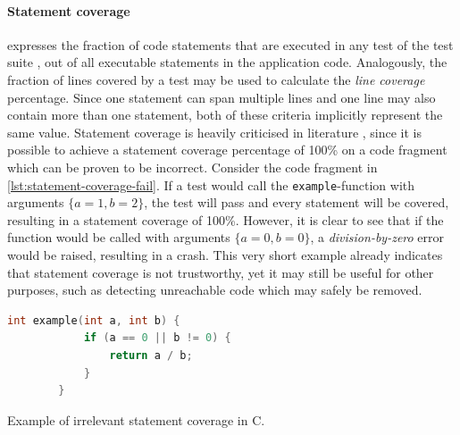 \paragraph*{Statement coverage} expresses the fraction of code statements that are executed in any test of the test suite \cite{6588537}, out of all executable statements in the application code. Analogously, the fraction of lines covered by a test may be used to calculate the \emph{line coverage} percentage. Since one statement can span multiple lines and one line may also contain more than one statement, both of these criteria implicitly represent the same value. Statement coverage is heavily criticised in literature \cite[p.~37]{Myers:2011:AST:2161638}, since it is possible to achieve a statement coverage percentage of 100\% on a code fragment which can be proven to be incorrect. Consider the code fragment in \autoref{lst:statement-coverage-fail}. If a test would call the \texttt{example}-function with arguments $\{a = 1, b = 2\}$, the test will pass and every statement will be covered, resulting in a statement coverage of 100\%. However, it is clear to see that if the function would be called with arguments $\{a = 0, b = 0\}$, a \emph{division-by-zero} error would be raised, resulting in a crash. This very short example already indicates that statement coverage is not trustworthy, yet it may still be useful for other purposes, such as detecting unreachable code which may safely be removed.

\begin{listing}
	\begin{lstlisting}[language=C]
		int example(int a, int b) {
			if (a == 0 || b != 0) {
				return a / b;
			}
		}
	\end{lstlisting}
	\captionsetup{skip=-2pt}
	\caption{Example of irrelevant statement coverage in C.}
	\label{lst:statement-coverage-fail}
\end{listing}

